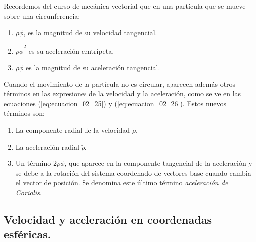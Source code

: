 \documentclass[12pt]{article}
\begin{document}
Recordemos del curso de mecánica vectorial que en una partícula que se mueve sobre una circunferencia:
\begin{enumerate}[label=\alph*)]
\item $\rho \dot{\phi}$, es la magnitud de su velocidad tangencial.
\item $\rho \dot{\phi}^{2}$ es su aceleración centrípeta.
\item $\rho \ddot{\phi}$ es la magnitud de su aceleración tangencial.
\end{enumerate}
Cuando el movimiento de la partícula no es circular, aparecen además otros términos en las expresiones de la velocidad y la aceleración, como se ve en las ecuaciones (\ref{eq:ecuacion_02_25}) y (\ref{eq:ecuacion_02_26}). Estos nuevos términos son:
\begin{enumerate}[label=\roman*)]
\item La componente radial de la velocidad $\dot{\rho}$.
\item La aceleración radial $\ddot{\rho}$.
\item Un término $2 \rho \dot{\phi}$, que aparece en la componente tangencial de la aceleración y se debe a la rotación del sistema coordenado de vectores base cuando cambia el vector de posición. Se denomina este último término \emph{aceleración de Coriolis}.
\end{enumerate}

\subsection{Velocidad y aceleración en coordenadas esféricas.}
\end{document}
